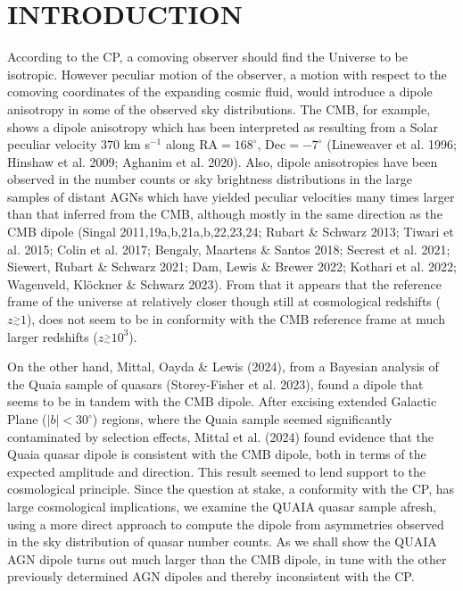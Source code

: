 \documentclass[fleqn,usenatbib]{mnras}
\begin{document}
\section{INTRODUCTION}
According to the CP, a comoving observer should find the Universe to be isotropic. 
However peculiar motion of the observer, a motion with respect to the comoving coordinates of the expanding cosmic fluid, would introduce a dipole anisotropy in some of the observed sky distributions. The CMB, for example, shows a dipole anisotropy which has been interpreted as resulting from a Solar peculiar velocity $370$ km s$^{-1}$ along RA$=168^{\circ}$, Dec$=-7^{\circ}$  (Lineweaver et al. 1996; Hinshaw et al. 2009; Aghanim et al. 2020). 
Also, dipole anisotropies have been observed in the number counts or sky brightness distributions in the large samples of distant AGNs which have yielded peculiar velocities many times larger than that inferred from the CMB, although mostly in the same direction as the CMB dipole (Singal 2011,19a,b,21a,b,22,23,24; Rubart \& Schwarz 2013; Tiwari et al. 2015; Colin et al. 2017; Bengaly, Maartens \& Santos 2018; Secrest et al. 2021; Siewert, Rubart \& Schwarz 2021; Dam, Lewis \& Brewer 2022; Kothari et al. 2022; Wagenveld, Kl\"ockner \& Schwarz 2023).
From that it appears that the reference frame of the universe at relatively closer though still at cosmological redshifts ($z\stackrel{>}{_{\sim}} 1$), does not seem to be in conformity with the CMB reference frame at much larger redshifts ($z\stackrel{>}{_{\sim}} 10^3$). 

On the other hand, Mittal, Oayda \& Lewis (2024), from a Bayesian analysis of the Quaia sample of quasars (Storey-Fisher et al. 2023), found a dipole that seems to be in tandem with the CMB dipole. After excising extended Galactic Plane ($|b|<30^\circ$) regions, where the Quaia sample seemed significantly  contaminated by selection effects, Mittal et al. (2024) found evidence that the Quaia quasar dipole is consistent with the CMB dipole, both in terms of the expected amplitude and direction. This result seemed  to lend support to the cosmological principle. 
Since the question at stake, a conformity with the CP, has large cosmological implications, we examine the QUAIA quasar sample afresh, using a more direct approach to compute the dipole from asymmetries observed in the sky distribution of quasar number counts. As we shall show the QUAIA AGN dipole turns out  much larger than the CMB dipole, in tune with the other previously determined  AGN dipoles and thereby  inconsistent with the CP. 
\end{document}
